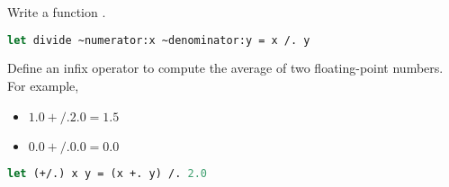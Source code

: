 \problem[divide]
Write a function .

\begin{lstlisting}[language=OCaml]
let divide ~numerator:x ~denominator:y = x /. y
\end{lstlisting}

\problem[average]
Define an infix operator  to compute the average of two floating-point numbers. For example,
\begin{itemize}
  \item $1.0 +/. 2.0 = 1.5$
  \item $0.0 +/. 0.0 = 0.0$
\end{itemize}

\begin{lstlisting}[language=OCaml]
let (+/.) x y = (x +. y) /. 2.0
\end{lstlisting}